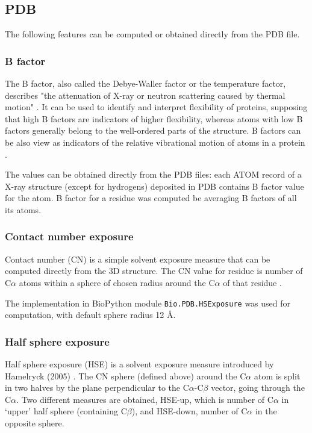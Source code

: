 \subsection{PDB}

The following features can be computed or obtained directly from the PDB file.

\subsubsection{B factor}

The B factor, also called the Debye-Waller factor or the temperature factor, describes "the attenuation of X-ray or neutron scattering caused by thermal motion" \cite{bfactor}. It can be used to identify and interpret flexibility of proteins, supposing that high B factors are indicators of higher flexibility, whereas atoms with low B factors generally belong to the well-ordered parts of the structure. B factors can be also view as indicators of the relative vibrational motion of atoms in a protein \cite{bfactor}.

The values can be obtained directly from the PDB files: each ATOM record of a X-ray structure (except for hydrogens) deposited in PDB contains B factor value for the atom. B factor for a residue was computed be averaging B factors of all its atoms. 

\subsubsection{Contact number exposure}

Contact number (CN) is a simple solvent exposure measure that can be computed directly from the 3D structure. The CN value for residue is number of C$\alpha$ atoms within a sphere of chosen radius around the C$\alpha$ of that residue \cite{cn}.

The implementation in BioPython module \texttt{Bio.PDB.HSExposure} was used for computation, with default sphere radius 12 {\AA}.


\subsubsection{Half sphere exposure}

Half sphere exposure (HSE) is a solvent exposure measure introduced by Hamelryck (2005) \cite{hse}. The CN sphere (defined above) around the C$\alpha$ atom is split in two halves by the plane perpendicular to the C$\alpha$-C$\beta$ vector, going through the C$\alpha$. Two different measures are obtained, HSE-up, which is number of C$\alpha$ in `upper' half sphere (containing C$\beta$), and HSE-down, number of C$\alpha$ in the opposite sphere.

